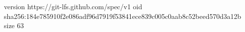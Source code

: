 version https://git-lfs.github.com/spec/v1
oid sha256:184e785910f2e086adf96d7919f53841ece839c005c0aab8c52beed570d3a12b
size 63
